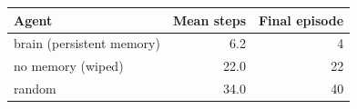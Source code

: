 \begin{tabular}{lrr}
\toprule
Agent & Mean steps & Final episode \\
\midrule
brain (persistent memory) & 6.2 & 4 \\
no memory (wiped) & 22.0 & 22 \\
random & 34.0 & 40 \\
\bottomrule
\end{tabular}
